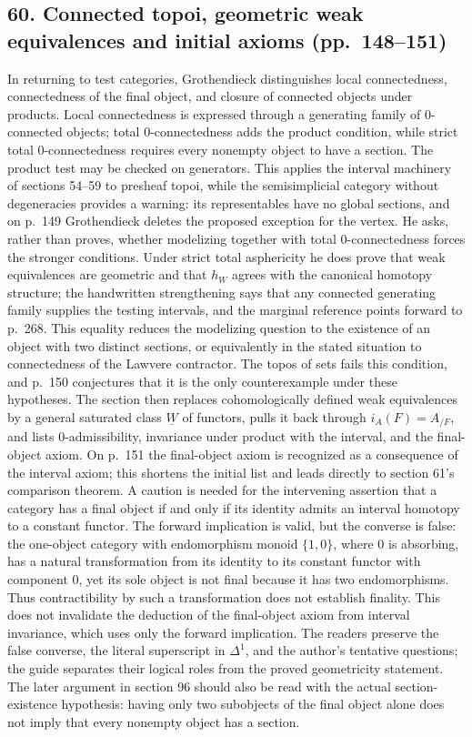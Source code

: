 \subsection*{60. Connected topoi, geometric weak equivalences and initial axioms (pp.~148--151)}
In returning to test categories, Grothendieck distinguishes local connectedness, connectedness of the final object, and closure of connected objects under products. Local connectedness is expressed through a generating family of 0-connected objects; total 0-connectedness adds the product condition, while strict total 0-connectedness requires every nonempty object to have a section. The product test may be checked on generators. This applies the interval machinery of sections 54--59 to presheaf topoi, while the semisimplicial category without degeneracies provides a warning: its representables have no global sections, and on p.~149 Grothendieck deletes the proposed exception for the vertex. He asks, rather than proves, whether modelizing together with total 0-connectedness forces the stronger conditions. Under strict total asphericity he does prove that weak equivalences are geometric and that $h_W$ agrees with the canonical homotopy structure; the handwritten strengthening says that any connected generating family supplies the testing intervals, and the marginal reference points forward to p.~268. This equality reduces the modelizing question to the existence of an object with two distinct sections, or equivalently in the stated situation to connectedness of the Lawvere contractor. The topos of sets fails this condition, and p.~150 conjectures that it is the only counterexample under these hypotheses. The section then replaces cohomologically defined weak equivalences by a general saturated class $\underline W$ of functors, pulls it back through $i_A(F)=A_{/F}$, and lists 0-admissibility, invariance under product with the interval, and the final-object axiom. On p.~151 the final-object axiom is recognized as a consequence of the interval axiom; this shortens the initial list and leads directly to section 61's comparison theorem. A caution is needed for the intervening assertion that a category has a final object if and only if its identity admits an interval homotopy to a constant functor. The forward implication is valid, but the converse is false: the one-object category with endomorphism monoid $\{1,0\}$, where 0 is absorbing, has a natural transformation from its identity to its constant functor with component 0, yet its sole object is not final because it has two endomorphisms. Thus contractibility by such a transformation does not establish finality. This does not invalidate the deduction of the final-object axiom from interval invariance, which uses only the forward implication. The readers preserve the false converse, the literal superscript in $\Delta^1$, and the author's tentative questions; the guide separates their logical roles from the proved geometricity statement. The later argument in section 96 should also be read with the actual section-existence hypothesis: having only two subobjects of the final object alone does not imply that every nonempty object has a section.

